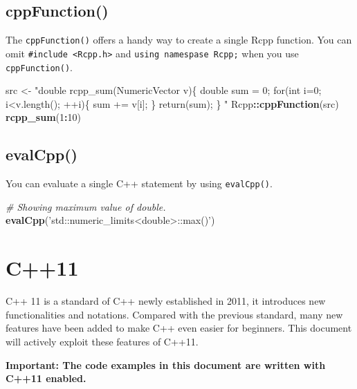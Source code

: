 \documentclass[]{book}
\newenvironment{Shaded}{\begin{snugshade}}{\end{snugshade}}
\newcommand{\CommentTok}[1]{\textcolor[rgb]{0.56,0.35,0.01}{\textit{#1}}}
\newcommand{\DecValTok}[1]{\textcolor[rgb]{0.00,0.00,0.81}{#1}}
\newcommand{\KeywordTok}[1]{\textcolor[rgb]{0.13,0.29,0.53}{\textbf{#1}}}
\newcommand{\NormalTok}[1]{#1}
\newcommand{\OperatorTok}[1]{\textcolor[rgb]{0.81,0.36,0.00}{\textbf{#1}}}
\newcommand{\StringTok}[1]{\textcolor[rgb]{0.31,0.60,0.02}{#1}}
\begin{document}
\hypertarget{cppfunction}{%
\section{cppFunction()}\label{cppfunction}}

The \texttt{cppFunction()} offers a handy way to create a single Rcpp function. You can omit \texttt{\#include\ \textless{}Rcpp.h\textgreater{}} and \texttt{using\ namespase\ Rcpp;} when you use \texttt{cppFunction()}.

\begin{Shaded}
\begin{Highlighting}[]
\NormalTok{src <-}
\StringTok{  "double rcpp_sum(NumericVector v)\{}
\StringTok{    double sum = 0;}
\StringTok{    for(int i=0; i<v.length(); ++i)\{}
\StringTok{      sum += v[i];}
\StringTok{    \}}
\StringTok{    return(sum);}
\StringTok{  \}}
\StringTok{  "}
\NormalTok{Rcpp}\OperatorTok{::}\KeywordTok{cppFunction}\NormalTok{(src)}
\KeywordTok{rcpp_sum}\NormalTok{(}\DecValTok{1}\OperatorTok{:}\DecValTok{10}\NormalTok{)}
\end{Highlighting}
\end{Shaded}

\hypertarget{evalcpp}{%
\section{evalCpp()}\label{evalcpp}}

You can evaluate a single C++ statement by using \texttt{evalCpp()}.

\begin{Shaded}
\begin{Highlighting}[]
\CommentTok{# Showing maximum value of double.}
\KeywordTok{evalCpp}\NormalTok{(}\StringTok{'std::numeric_limits<double>::max()'}\NormalTok{)}
\end{Highlighting}
\end{Shaded}

\hypertarget{c11}{%
\chapter{C++11}\label{c11}}

C++ 11 is a standard of C++ newly established in 2011, it introduces new functionalities and notations. Compared with the previous standard, many new features have been added to make C++ even easier for beginners. This document will actively exploit these features of C++11.

\textbf{Important: The code examples in this document are written with C++11 enabled.}
\end{document}
